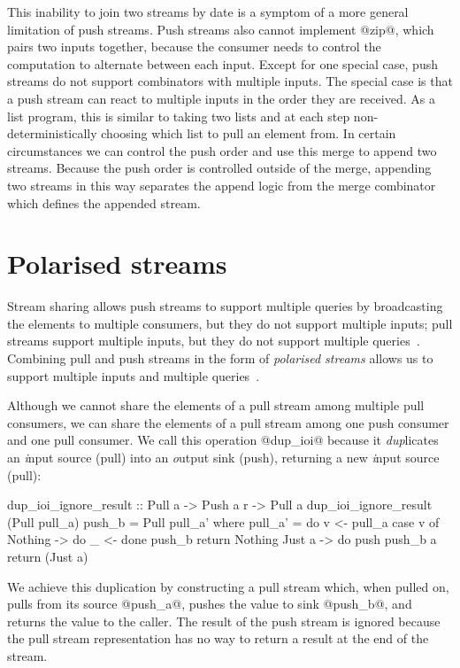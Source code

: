 This inability to join two streams by date is a symptom of a more general limitation of push streams.
Push streams also cannot implement @zip@, which pairs two inputs together, because the consumer needs to control the computation to alternate between each input.
Except for one special case, push streams do not support combinators with multiple inputs.
The special case is that a push stream can react to multiple inputs in the order they are received.
As a list program, this is similar to taking two lists and at each step non-deterministically choosing which list to pull an element from.
In certain circumstances we can control the push order and use this merge to append two streams.
Because the push order is controlled outside of the merge, appending two streams in this way separates the append logic from the merge combinator which defines the appended stream.

\section{Polarised streams}
\label{taxonomy/polarised}

Stream sharing allows push streams to support multiple queries by broadcasting the elements to multiple consumers, but they do not support multiple inputs; pull streams support multiple inputs, but they do not support multiple queries~\citep{kay2009you}.
Combining pull and push streams in the form of \emph{polarised streams} allows us to support multiple inputs and multiple queries~\citep{lippmeier2016polarized}.


Although we cannot share the elements of a pull stream among multiple pull consumers, we can share the elements of a pull stream among one push consumer and one pull consumer.
We call this operation @dup_ioi@ because it \emph{dup}licates an \emph{i}nput source (pull) into an \emph{o}utput sink (push), returning a new \emph{i}nput source (pull):

\begin{haskell}
dup_ioi_ignore_result :: Pull a -> Push a r -> Pull a
dup_ioi_ignore_result (Pull pull_a) push_b = Pull pull_a'
 where
  pull_a' = do
    v <- pull_a
    case v of
     Nothing -> do
      _ <- done push_b
      return Nothing
     Just a -> do
      push push_b a
      return (Just a)
\end{haskell}

We achieve this duplication by constructing a pull stream which, when pulled on, pulls from its source @push_a@, pushes the value to sink @push_b@, and returns the value to the caller.
The result of the push stream is ignored because the pull stream representation has no way to return a result at the end of the stream.

